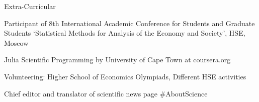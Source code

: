 \documentclass{resume} %
\begin{document}
\begin{rSection}{Extra-Curricular} \vspace{-6pt}
\item Participant of 8th International Academic Conference for Students and Graduate Students ‘Statistical Methods for Analysis of the Economy and Society’, HSE, Moscow
\item Julia Scientific Programming by University of Cape Town at coursera.org
\item Volunteering: Higher School of Economics Olympiads, Different HSE activities
\item Chief editor and translator of scientific news page \#AboutScience
\end{rSection}
\end{document}
